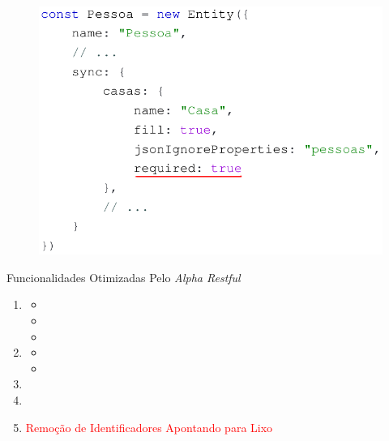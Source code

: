 \documentclass{beamer} %
\begin{document}
\begin{frame}
    \begin{figure}
        \centering
        \includegraphics[width=\linewidth]{imagens/relacao-de-dependencia.png}
        \label{fig:relacao-de-dependencia}
    \end{figure}
\end{frame}

\begin{frame}{Funcionalidades Otimizadas Pelo \textit{Alpha Restful}}
    \begin{enumerate}
        \item {}
            \begin{itemize}
                \item {}
                \item {}
                \item {}
            \end{itemize}
        \item {}
            \begin{itemize}
                \item {}
                \item {}
            \end{itemize}
        \item {}
        \item {}
        \item \textcolor{red}{Remoção de Identificadores Apontando para Lixo}
    \end{enumerate}
\end{frame}
\end{document}
